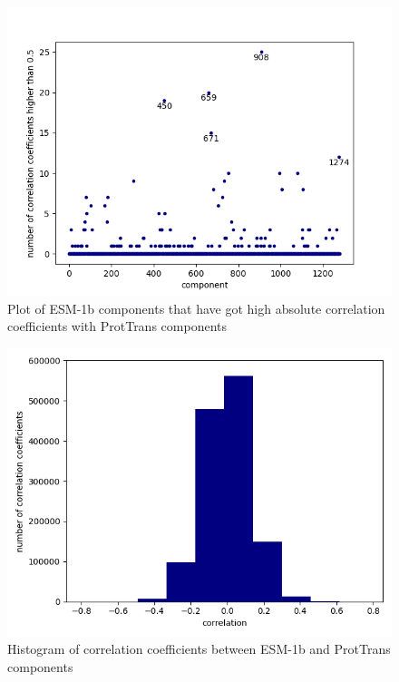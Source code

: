 \documentclass[12pt]{article}
\begin{document}
	\begin{figure}[h!]
		\centering
		\includegraphics[scale=0.85]{validation_small_set_2_joined_correlation_high_corr.png}

		\caption{Plot of ESM-1b components that have got high absolute correlation 
		coefficients with ProtTrans components}
		\label{figure:highCorrelationComponents}
	\end{figure}

	\newpage

	\begin{figure}[h!]
		\centering
		\includegraphics[scale=0.85]{validation_small_set_2_joined_correlation_hist.png}

		\caption{Histogram of correlation coefficients between ESM-1b 
		and ProtTrans components}
		\label{figure:correlationComponentsHisto}
	\end{figure}
\end{document}
